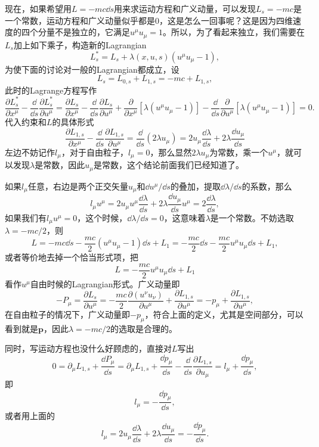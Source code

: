\documentclass[10pt]{book}
\begin{document}
现在，如果希望用$L=-mc \dd s$用来求运动方程和广义动量，可以发现$L_s=-mc$是一个常数，运动方程和广义动量似乎都是0，这是怎么一回事呢？这是因为四维速度的四个分量不是独立的，它满足$u^\mu u_\mu=1$。所以，为了看起来独立，我们需要在$L_s$加上如下乘子，构造新的Lagrangian
\[
	L^*_s=L_s+\lambda(x,u,s) (u^\mu u_\mu-1),
\]
为使下面的讨论对一般的Lagrangian都成立，设
\[
L_s=L_{0,s}+L_{1,s}=-mc+L_{1,s},
\]
此时的Lagrange方程写作
\begin{equation}
	\frac{\partial L^*_s}{\partial x^\mu}-\frac{\dd}{\dd s}\frac{\partial L^*_s}{\partial u^\mu}=\frac{\partial L_s}{\partial x^\mu}-\frac{\dd}{\dd s}\frac{\partial L_s}{\partial u^\mu}+\frac{\partial}{\partial x^\mu}[\lambda (u^\mu u_\mu-1)]-\frac{\dd}{\dd s}\frac{\partial}{\partial u^\mu}[\lambda(u^\mu u_\mu-1)]=0.
\label{lagra}
\end{equation}
代入约束和$L$的具体形式
\[
	\frac{\partial L_{1,s}}{\partial x^\mu}-\frac{\dd}{\dd s}\frac{\partial L_{1,s}}{\partial u^\mu}=\frac{\dd}{\dd s}\left(2\lambda u_\mu\right)=2u_\mu\frac{\dd \lambda }{\dd s}+2\lambda \frac{\dd u_\mu}{\dd s}
\]
左边不妨记作$l_\mu$，对于自由粒子，$l_\mu=0$，那么显然$2\lambda u_\mu$为常数，乘一个$u^\mu$，就可以发现$\lambda$是常数，因此$u_\mu$是常数，这个结论前面我们已经知道了。

如果$l_\mu$任意，右边是两个正交矢量$u_\mu$和$\dd u^\mu/\dd s$的叠加，提取$\dd \lambda/\dd s$的系数，那么
\[
	l_\mu u^\mu =2u_\mu u^\mu\frac{\dd \lambda }{\dd s}+2\lambda \frac{\dd u_\mu}{\dd s}u^\mu=2\frac{\dd \lambda }{\dd s},
\]
如果我们有$l_\mu u^\mu=0$，这个时候，$\dd \lambda /\dd s=0$，这意味着$\lambda$是一个常数。不妨选取$\lambda = -mc/2$，则
\[
	L=-mc\dd s-\frac{mc}{2}(u^\mu u_\mu-1)\dd s+L_1=-\frac{mc}{2}\dd s-\frac{mc}{2}u^\mu u_\mu\dd s+L_1,
\]
或者等价地去掉一个恰当形式项，把
\begin{equation}
	L=-\frac{mc}{2}u^\mu u_\mu\dd s+L_1
	\label{freeparticle}
\end{equation}
看作$u^\mu$自由时候的Lagrangian形式。广义动量即
\[
	-P_\mu=\frac{\partial L_s}{\partial u^\mu}=-\frac{mc}{2}\frac{\partial (u^\nu u_\nu)}{\partial u^\mu}+\frac{\partial L_{1,s}}{\partial u^\mu}=-p_\mu+\frac{\partial L_{1,s}}{\partial u^\mu},
\]
在自由粒子的情况下，广义动量即$-p_\mu$，符合上面的定义，尤其是空间部分，可以看到就是$\bm{p}$，因此$\lambda = -mc/2$的选取是合理的。

同时，写运动方程也没什么好顾虑的，直接对$L$写出
\[
	0=\partial_{\mu} L_{1,s}+\frac{\dd P_\mu}{\dd s}=\partial_{\mu} L_{1,s}+\frac{\dd p_\mu}{\dd s}-\frac{\dd }{\dd s}\frac{\partial L_{1,s}}{\partial u_\mu}=l_\mu+\frac{\dd p_\mu}{\dd s},
\]
即
\begin{equation}
	l_\mu=-\frac{\dd p_\mu}{\dd s},
	\label{leq1}
\end{equation}
或者用上面的
\[
	l_\mu=2u_\mu\frac{\dd \lambda }{\dd s}+2\lambda \frac{\dd u_\mu}{\dd s}=-\frac{\dd p_\mu}{\dd s}.
\]
\end{document}
